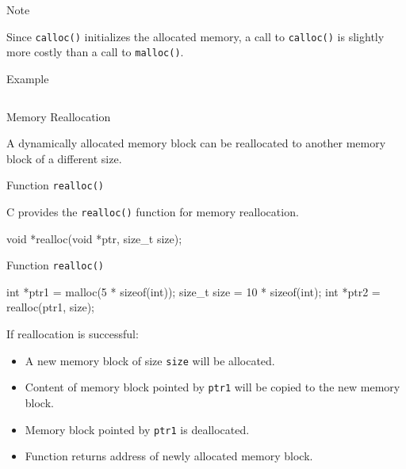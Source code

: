 \documentclass[compress]{beamer}
\begin{document}
\begin{slide}
	\begin{block}{Note}

	Since \texttt{calloc()} initializes the allocated memory, a call to \texttt{calloc()} is slightly more costly than a call to \texttt{malloc()}.

	\end{block}
\end{slide}

\begin{slide}
	\begin{block}{Example}

	\inputminted[fontsize=\scriptsize, firstline=10, linenos]{c}{
		\resDirectory/malloc.c
	}

	\end{block}
\end{slide}

\begin{slide}
	\begin{block}{Memory Reallocation}

	A dynamically allocated memory block can be reallocated to another memory block of a different size.

	\end{block}
\end{slide}

\begin{slide}
	\begin{block}{Function \texttt{realloc()}}

	C provides the \texttt{realloc()} function for memory reallocation.

	\begin{terminal}
	void *realloc(void *ptr, size_t size);
	\end{terminal}

	\end{block}
\end{slide}

\begin{slide}
	\begin{block}{Function \texttt{realloc()}}

	\begin{terminal}
	int *ptr1 = malloc(5 * sizeof(int));
	size_t size = 10 * sizeof(int);
	int *ptr2 = realloc(ptr1, size);
	\end{terminal}

	If reallocation is successful:
	\begin{itemize}
	\item[] A new memory block of size \texttt{size} will be allocated.
	\item[] Content of memory block pointed by \texttt{ptr1} will be copied to the new memory block.
	\item[] Memory block pointed by \texttt{ptr1} is deallocated.
	\item[] Function returns address of newly allocated memory block.
	\end{itemize}

	\end{block}
\end{slide}
\end{document}
